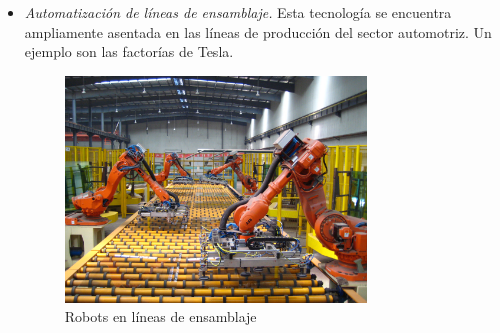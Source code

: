 \begin{itemize}
  \item \textit{Automatización de líneas de ensamblaje.} Esta tecnología se encuentra ampliamente asentada en las líneas de  producción 
                                                        del sector automotriz. Un ejemplo son las factorías de Tesla.  
  \begin{figure} [h!]
    \begin{center}
      \includegraphics[width=8cm]{figs/industrial_robot.jpg}
    \end{center}
    \caption{Robots en líneas de ensamblaje}
    \label{fig:robIndustrialChain}
  \end{figure}\   


\end{itemize}

